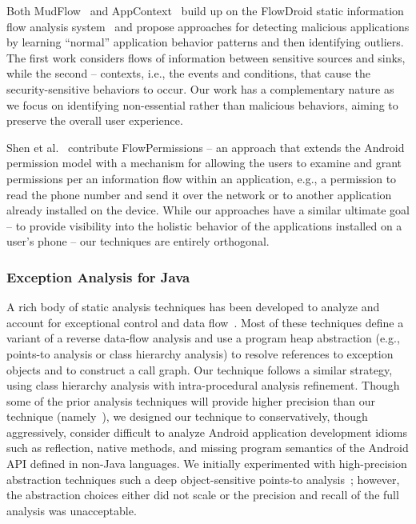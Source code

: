 Both MudFlow~\cite{Avdiienko:Kuznetsov:Gorla:Zeller:Arzt:Rasthofer:Bodden:ICSE15} and AppContext~\cite{Yang:Xiao:Andow:Li:Xie:Enck:ICSE15} build up on the FlowDroid static information flow analysis system~\cite{Arzt:Rasthofer:Fritz:Bodden:Bartel:Klein:Traon:Octeau:McDaniel:PLDI14} and propose approaches 
for detecting malicious applications by learning ``normal'' application behavior patterns and then identifying outliers. 
The first work considers flows of information between sensitive sources and sinks, while the second  -- contexts, i.e., the events and conditions, that cause the security-sensitive behaviors to occur. 
Our work has a complementary nature as we focus on identifying non-essential rather than malicious behaviors, aiming to preserve the overall user experience. 

Shen et al.~\cite{Shen:Vishnubhotla:Todarka:Arora:Dhandapani:Lehner:Ko:Ziarek:ASE14} contribute FlowPermissions -- 
an approach that extends the Android permission model with a mechanism for allowing the users to examine and grant permissions per an information flow within an application, e.g., a permission to read
the phone number and send it over the network or to another application already installed on the device. 
While our approaches have a similar ultimate goal -- to provide visibility into the holistic behavior of the applications installed on a user's phone -- our techniques are entirely orthogonal. 


\subsubsection{Exception Analysis for Java}  A rich body of static analysis
techniques has been developed to analyze and account for exceptional
control and data
flow~\cite{Byeong-MoChang2002,Chang2001,Fu2005,Fu2007,Jo2004,Qiu2010,Kastrinis2013}.
Most of these techniques define a variant of a reverse data-flow
analysis and use a program heap abstraction (e.g., points-to
analysis or class hierarchy analysis) to resolve references to
exception objects and to construct a call graph. Our technique follows
a similar strategy, using class hierarchy analysis with
intra-procedural analysis refinement.  Though some of the prior
analysis techniques will provide higher precision than our technique
(namely~\cite{Fu2005,Fu2007,Qiu2010}), we designed our technique to
conservatively, though aggressively, consider difficult to analyze
Android application development idioms such as reflection, native
methods, and missing program semantics of the Android API defined in
non-Java languages.  We initially experimented with high-precision
abstraction techniques such a deep object-sensitive points-to
analysis~\cite{Smaragdakis2011}; however, the abstraction choices
either did not scale or the precision and recall of the full analysis
was unacceptable.
